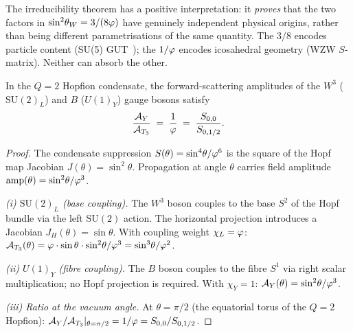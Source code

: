 \begin{remark}
\label{P1:rem:irreducibility_positive}
The irreducibility theorem has a positive interpretation: it
\emph{proves} that the two factors in $\sin^{2}\!\theta_{W}=3/(8\varphi)$ have
genuinely independent physical origins, rather than being
different parametrisations of the same quantity.
The $3/8$ encodes particle content (SU(5) GUT~\cite{GeorgiGlashow1974}); the $1/\varphi$ encodes
icosahedral geometry (WZW $S$-matrix).  Neither can absorb the other.
\end{remark}

\begin{theorem}
\label{P1:thm:amplitude_ratio}
In the $Q=2$ Hopfion condensate, the forward-scattering amplitudes
of the $W^3$ ($\mathrm{SU}(2)_L$) and $B$ ($U(1)_Y$) gauge bosons satisfy
\begin{equation}
  \frac{\mathcal{A}_{Y}}{\mathcal{A}_{T_3}}
  \;=\; \frac{1}{\varphi}
  \;=\; \frac{S_{0,0}}{S_{0,1/2}}.
  \label{P1:eq:amp_ratio}
\end{equation}
\end{theorem}
\begin{proof}
The condensate suppression $S(\theta)=\sin^4\!\theta/\varphi^6$ is the
square of the Hopf map Jacobian $J(\theta)=\sin^2\!\theta$.
Propagation at angle $\theta$ carries field amplitude
$\mathrm{amp}(\theta)=\sin^2\!\theta/\varphi^3$.

\emph{(i) $\mathrm{SU}(2)_L$ (base coupling).}
The $W^3$ boson couples to the base $S^2$ of the Hopf bundle via the
left $\mathrm{SU}(2)$ action.  The horizontal projection introduces a
Jacobian $J_H(\theta)=\sin\theta$.
With coupling weight $\chi_L=\varphi$:
$\mathcal{A}_{T_3}(\theta) = \varphi\cdot\sin\theta\cdot\sin^2\!\theta/\varphi^3 = \sin^3\!\theta/\varphi^2$.

\emph{(ii) $U(1)_Y$ (fibre coupling).}
The $B$ boson couples to the fibre $S^1$ via right scalar multiplication;
no Hopf projection is required.  With $\chi_Y=1$:
$\mathcal{A}_{Y}(\theta) = \sin^2\!\theta/\varphi^3$.

\emph{(iii) Ratio at the vacuum angle.}
At $\theta=\pi/2$ (the equatorial torus of the $Q=2$ Hopfion):
$\mathcal{A}_{Y}/\mathcal{A}_{T_3}|_{\theta=\pi/2} = 1/\varphi = S_{0,0}/S_{0,1/2}$.
\end{proof}

